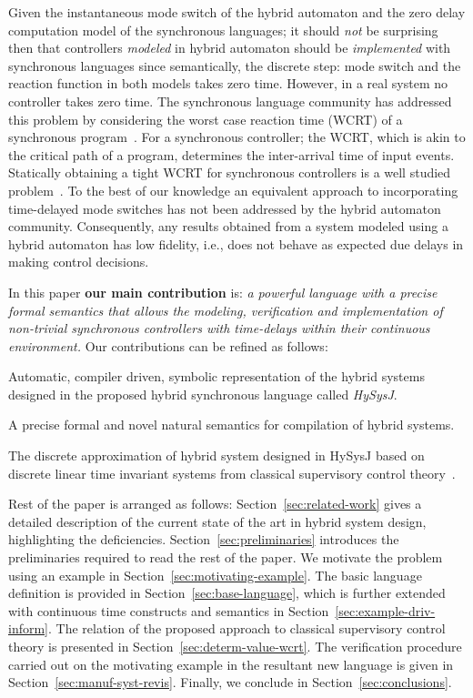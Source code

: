 \documentclass[10pt,journal,cspaper,compsoc]{IEEEtran}
\begin{document}
Given the instantaneous mode switch of the hybrid automaton and the zero
delay computation model of the synchronous languages; it should
\textit{not} be surprising then that controllers \textit{modeled} in
hybrid automaton should be \textit{implemented} with synchronous
languages since semantically, the discrete step: mode switch and the
reaction function in both models takes zero time. However, in a real
system no controller takes zero time. The synchronous language community
has addressed this problem by considering the worst case reaction time
(WCRT) of a synchronous program~\cite{boldt07}. For a synchronous
controller; the WCRT, which is akin to the critical path of a program,
determines the inter-arrival time of input events. Statically obtaining
a tight WCRT for synchronous controllers is a well studied
problem~\cite{proop10,wilhelm08,boldt07}. To the best of our knowledge
an equivalent approach to incorporating time-delayed mode switches has
not been addressed by the hybrid automaton community. Consequently, any
results obtained from a system modeled using a hybrid automaton has low
fidelity, i.e., does not behave as expected due delays in making control
decisions.

In this paper \textbf{our main contribution} is: \textit{a powerful
  language with a precise formal semantics that allows the modeling,
  verification and implementation of non-trivial synchronous controllers
  with time-delays within their continuous environment.}  Our
contributions can be refined as follows:

\begin{compactitem}
\item Automatic, compiler driven, symbolic representation of the hybrid
  systems designed in the proposed hybrid synchronous language called
  \textit{HySysJ}.
\item A precise formal and novel natural semantics for compilation of
  hybrid systems.
\item The discrete approximation of hybrid system designed in HySysJ
  based on discrete linear time invariant systems from classical
  supervisory control theory~\cite{Astrom:2008:FSI:1816978}.
\end{compactitem}








Rest of the paper is arranged as follows: Section~\ref{sec:related-work}
gives a detailed description of the current state of the art in hybrid
system design, highlighting the
deficiencies. Section~\ref{sec:preliminaries} introduces the
preliminaries required to read the rest of the paper. We motivate the
problem using an example in Section~\ref{sec:motivating-example}. The
basic language definition is provided in
Section~\ref{sec:base-language}, which is further extended with
continuous time constructs and semantics in
Section~\ref{sec:example-driv-inform}. The relation of the proposed
approach to classical supervisory control theory is presented in
Section~\ref{sec:determ-value-wcrt}.
The verification procedure carried out on the motivating example in the
resultant new language is given in
Section~\ref{sec:manuf-syst-revis}. Finally, we conclude in
Section~\ref{sec:conclusions}.
\end{document}
